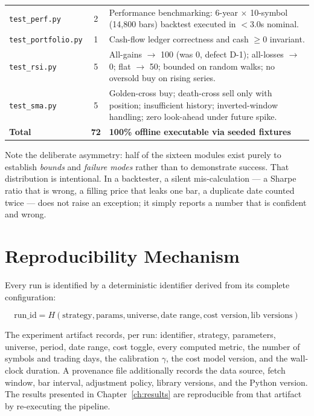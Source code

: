 \documentclass[12pt,a4paper,oneside]{report}
\begin{document}
\begin{center}
\begin{longtable}{@{}p{4.5cm}cp{7.0cm}@{}}
\texttt{test\_perf.py} & 2 & Performance benchmarking: 6-year $\times$ 10-symbol (14,800 bars) backtest executed in $<3.0$s nominal. \\
\texttt{test\_portfolio.py} & 1 & Cash-flow ledger correctness and cash $\ge 0$ invariant. \\
\texttt{test\_rsi.py} & 5 & All-gains $\to$ 100 (was 0, defect D-1); all-losses $\to$ 0; flat $\to$ 50; bounded on random walks; no oversold buy on rising series. \\
\texttt{test\_sma.py} & 5 & Golden-cross buy; death-cross sell only with position; insufficient history; inverted-window handling; zero look-ahead under future spike. \\
\midrule
\textbf{Total} & \textbf{72} & \textbf{100\% offline executable via seeded fixtures} \\
\bottomrule
\end{longtable}
\end{center}

Note the deliberate asymmetry: half of the sixteen modules exist purely to
establish \emph{bounds} and \emph{failure modes} rather than to demonstrate
success. That distribution is intentional. In a backtester, a silent
mis-calculation --- a Sharpe ratio that is wrong, a filling price that leaks one
bar, a duplicate date counted twice --- does not raise an exception; it simply
reports a number that is confident and wrong.

\section{Reproducibility Mechanism}

Every run is identified by a deterministic identifier derived from its complete
configuration:

\begin{equation}
\text{run\_id} = H\left(\text{strategy}, \text{params}, \text{universe}, \text{date\ range}, \text{cost\ version}, \text{lib\ versions}\right)
\end{equation}

The experiment artifact records, per run: identifier, strategy, parameters,
universe, period, date range, cost toggle, every computed metric, the number of
symbols and trading days, the calibration $\gamma$, the cost model version, and
the wall-clock duration. A provenance file additionally records the data source,
fetch window, bar interval, adjustment policy, library versions, and the Python
version. The results presented in Chapter~\ref{ch:results} are reproducible from
that artifact by re-executing the pipeline.
\end{document}

